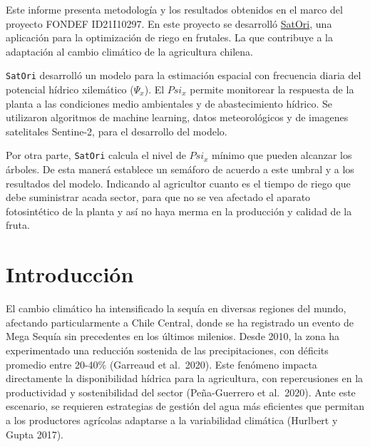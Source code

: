 \documentclass[
  letterpaper,
  DIV=11,
  numbers=noendperiod]{scrreprt}
\begin{document}

Este informe presenta metodología y los resultados obtenidos en el marco
del proyecto FONDEF ID21I10297. En este proyecto se desarrolló
\href{https://s4tori.cl}{SatOri}, una aplicación para la optimización de
riego en frutales. La que contribuye a la adaptación al cambio climático
de la agricultura chilena.

\texttt{SatOri} desarrolló un modelo para la estimación espacial con
frecuencia diaria del potencial hídrico xilemático (\(\Psi_x\)). El
\(Psi_x\) permite monitorear la respuesta de la planta a las condiciones
medio ambientales y de abastecimiento hídrico. Se utilizaron algoritmos
de machine learning, datos meteorológicos y de imagenes satelitales
Sentine-2, para el desarrollo del modelo.

Por otra parte, \texttt{SatOri} calcula el nivel de \(Psi_x\) mínimo que
pueden alcanzar los árboles. De esta manerá establece un semáforo de
acuerdo a este umbral y a los resultados del modelo. Indicando al
agricultor cuanto es el tiempo de riego que debe suministrar acada
sector, para que no se vea afectado el aparato fotosintético de la
planta y así no haya merma en la producción y calidad de la fruta.


\chapter*{Introducción}\label{introducciuxf3n}


El cambio climático ha intensificado la sequía en diversas regiones del
mundo, afectando particularmente a Chile Central, donde se ha registrado
un evento de Mega Sequía sin precedentes en los últimos milenios. Desde
2010, la zona ha experimentado una reducción sostenida de las
precipitaciones, con déficits promedio entre 20-40\% (Garreaud et
al.~2020). Este fenómeno impacta directamente la disponibilidad hídrica
para la agricultura, con repercusiones en la productividad y
sostenibilidad del sector (Peña-Guerrero et al.~2020). Ante este
escenario, se requieren estrategias de gestión del agua más eficientes
que permitan a los productores agrícolas adaptarse a la variabilidad
climática (Hurlbert y Gupta 2017).
\end{document}
